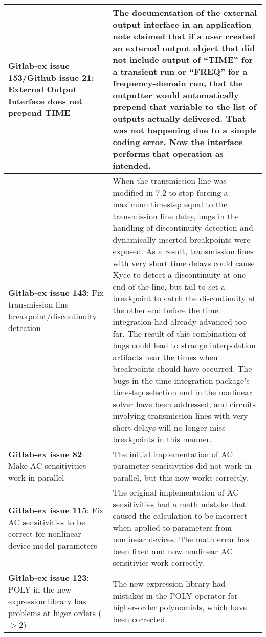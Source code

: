 {\begin{longtable}[h] {>{\raggedright\small}m{2in}|>{\raggedright\let\\\tabularnewline\small}m{3.5in}}
\textbf{Gitlab-ex issue 153/Github issue 21}: External Output Interface does not prepend TIME &
The documentation of the external output interface in an application
note claimed that if a user created an external output object that did
not include output of ``TIME'' for a transient run or ``FREQ'' for a
frequency-domain run, that the outputter would automatically prepend
that variable to the list of outputs actually delivered.  That was not
happening due to a simple coding error.  Now the interface performs
that operation as intended. \\ \hline

\textbf{Gitlab-ex issue 143}: Fix transmission line breakpoint/discontinuity detection &
When the transmission line was modified in \Xyce{} 7.2 to stop forcing
a maximum timestep equal to the transmission line delay, bugs in the
handling of discontinuity detection and dynamically inserted
breakpoints were exposed.  As a result, transmission lines with very
short time delays could cause Xyce to detect a discontinuity at one
end of the line, but fail to set a breakpoint to catch the
discontinuity at the other end before the time integration had already
advanced too far.  The result of this combination of bugs could lead
to strange interpolation artifacts near the times when breakpoints
should have occurred.  The bugs in the time integration package's
timestep selection and in the nonlinear solver have been addressed,
and circuits involving transmission lines with very short delays will
no longer miss breakpoints in this manner. \\ \hline

\textbf{Gitlab-ex issue 82}:  Make AC sensitivities work in parallel &
The initial implementation of AC parameter sensitivities did not work in 
  parallel, but this now works correctly.
\\ \hline

\textbf{Gitlab-ex issue 115}:  Fix AC sensitivities to be correct for nonlinear 
  device model parameters & The original implementation of AC sensitivities had 
  a math mistake that caused the calculation to be incorrect when applied to 
  parameters from nonlinear devices.  The math error has been fixed and now
  nonlinear AC sensitivies work correctly.
\\ \hline

\textbf{Gitlab-ex issue 123}:  POLY in the new expression library has problems 
  at higer orders ($>$2) & The new expression library had mistakes in the POLY 
  operator for higher-order polynomials, which have been corrected.  
\\ \hline


\end{longtable}}
